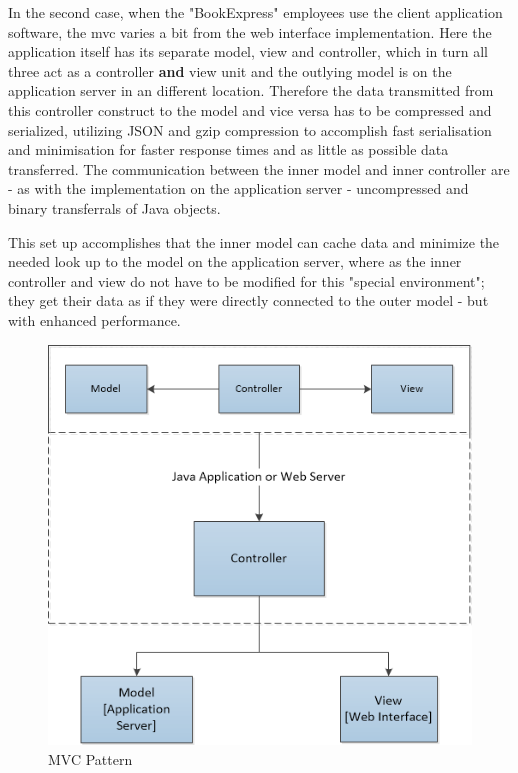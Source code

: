 \documentclass[11pt,a4paper,oneside,svgnames]{report}
\begin{document}
In the second case, when the "BookExpress" employees use the client application software, the \gls{mvc} varies a bit from the web interface implementation. Here the application itself has its separate model, view and controller, which in turn all three act as a controller \textbf{and} view unit and the outlying model is on the application server in an different location. Therefore the data transmitted from this controller construct to the model and vice versa has to be compressed and serialized, utilizing JSON and gzip compression to accomplish fast serialisation and minimisation for faster response times and as little as possible data transferred. The communication between the inner model and inner controller are - as with the implementation on the application server - uncompressed and binary transferrals of Java objects.

This set up accomplishes that the inner model can cache data and minimize the needed look up to the model on the application server, where as the inner controller and view do not have to be modified for this "special environment"; they get their data as if they were directly connected to the outer model - but with enhanced performance.

\begin{figure}[H]
 \begin{center}
  \includegraphics[width=\textwidth]{MVC-small.png}
 \end{center}
 \caption{MVC Pattern}
\end{figure}
\end{document}
